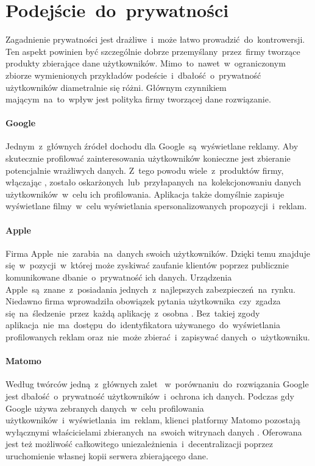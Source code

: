 \section{Podejście~do~prywatności}
Zagadnienie prywatności jest drażliwe~i~może łatwo prowadzić~do~kontrowersji. Ten aspekt powinien być szczególnie dobrze przemyślany~przez~firmy tworzące produkty zbierające dane użytkowników. Mimo~to~nawet~w~ograniczonym zbiorze wymienionych przykładów podeście~i~dbałość~o~prywatność użytkowników diametralnie się różni. Głównym czynnikiem mającym~na~to~wpływ jest polityka firmy tworzącej dane rozwiązanie.

\paragraph{Google}
Jednym~z~głównych źródeł dochodu dla Google~są~wyświetlane reklamy. Aby skutecznie profilować zainteresowania użytkowników konieczne jest zbieranie potencjalnie wrażliwych danych. Z~tego powodu wiele~z~produktów firmy, włączając , zostało oskarżonych~lub~przyłapanych~na~kolekcjonowaniu danych użytkowników~w~celu ich profilowania. Aplikacja  także domyślnie zapisuje wyświetlane filmy~w~celu wyświetlania spersonalizowanych propozycji~i~reklam.

\paragraph{Apple}
Firma Apple~nie~zarabia~na~danych swoich użytkowników. Dzięki temu znajduje się~w~pozycji~w~której może zyskiwać zaufanie klientów poprzez publicznie komunikowane dbanie~o~prywatność ich danych. Urządzenia Apple~są~znane~z~posiadania jednych~z~najlepszych zabezpieczeń~na~rynku. Niedawno firma wprowadziła obowiązek pytania użytkownika~czy~zgadza się~na~śledzenie~przez~każdą aplikację~z~osobna \cite{Apple_Ad_Transparency}. Bez~takiej zgody aplikacja~nie~ma~dostępu~do~identyfikatora używanego~do~wyświetlania profilowanych reklam oraz~nie~może zbierać~i~zapisywać danych~o~użytkowniku.

\paragraph{Matomo}
Według twórców jedną~z~głównych zalet ~w~porównaniu~do~rozwiązania Google jest dbałość~o~prywatność użytkowników~i~ochrona ich danych. Podczas gdy Google używa zebranych danych~w~celu profilowania użytkowników~i~wyświetlania~im~reklam, klienci platformy Matomo pozostają wyłącznymi właścicielami zbieranych~na~swoich witrynach danych \cite{Matomo_Data}. Oferowana jest też możliwość całkowitego uniezależnienia~i~decentralizacji poprzez uruchomienie własnej kopii serwera zbierającego dane.

